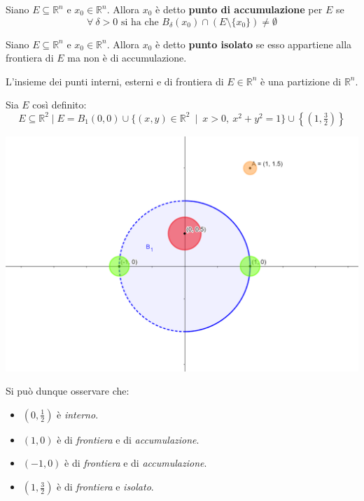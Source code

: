 \begin{definition}
    Siano $E \subseteq \mathbb{R}^n$ e $x_0 \in \mathbb{R}^n$. Allora $x_0$ è detto \textbf{punto di accumulazione} per $E$ se 
    \begin{equation}
        \forall \ \delta>0 \text{ si ha che } B_\delta(x_0) \cap \left(E \setminus \{x_0\}\right) \neq \emptyset
    \end{equation}
\end{definition}
\begin{definition}
    Siano $E \subseteq \mathbb{R}^n$ e $x_0 \in \mathbb{R}^n$. Allora $x_0$ è detto \textbf{punto isolato} se esso appartiene alla frontiera di $E$ ma non è di accumulazione.
\end{definition}
\begin{proposition}
    L'insieme dei punti interni, esterni e di frontiera di $E \in \mathbb{R}^n$ è una partizione di $\mathbb{R}^n$.
\end{proposition}
\begin{example}
    Sia $E$ così definito:
    \begin{equation*}
        E \subseteq \mathbb{R}^2 \mid E= B_1(0,0) \cup \{(x,y) \in \mathbb{R}^2\ \mid \ x>0, \ x^2+ y^2=1\} \cup \left\{\left(1,\tfrac{3}{2}\right)\right\}
    \end{equation*}
    \begin{minipage}{0.3\textwidth}
        \centering
        \includegraphics[width=\textwidth]{Capitoli/Capitolo2/Punti2.png}
    \end{minipage}
    \hfill
    \begin{minipage}{0.55\textwidth}  %
        Si può dunque osservare che:
        \begin{itemize}
            \item $(0, \tfrac{1}{2})$ è \textit{interno}.
            \item $(1,0) $ è di \textit{frontiera} e di \textit{accumulazione}.
            \item $(-1,0) $ è di \textit{frontiera} e di \textit{accumulazione}.
            \item $(1, \tfrac{3}{2}) $ è di \textit{frontiera} e \textit{isolato}.
        \end{itemize}      
    \end{minipage}
\end{example}
